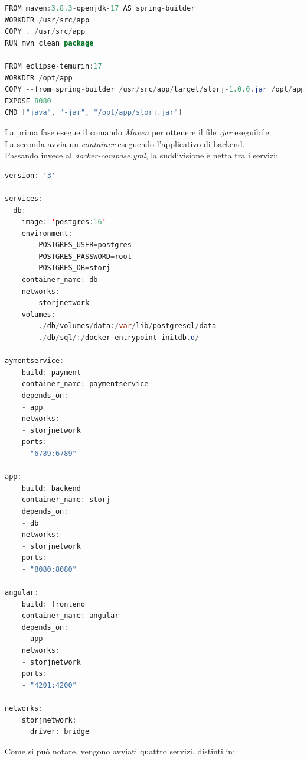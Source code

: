 \documentclass{article}
\begin{document}
\vspace*{7pt}
\begin{lstlisting}[language = JAVA]
FROM maven:3.8.3-openjdk-17 AS spring-builder
WORKDIR /usr/src/app
COPY . /usr/src/app
RUN mvn clean package

FROM eclipse-temurin:17
WORKDIR /opt/app
COPY --from=spring-builder /usr/src/app/target/storj-1.0.0.jar /opt/app/storj.jar
EXPOSE 8080
CMD ["java", "-jar", "/opt/app/storj.jar"]
\end{lstlisting}
La prima fase esegue il comando \textit{Maven} per ottenere il file \textit{.jar} eseguibile.\\
La seconda avvia un \textit{container} eseguendo l'applicativo di backend.\vspace*{130pt}\\
Passando invece al \textit{docker-compose.yml}, la suddivisione è netta tra i servizi:\vspace*{7pt}
\begin{lstlisting}[language = JAVA]
version: '3'

services:
  db:
    image: 'postgres:16'
    environment:
      - POSTGRES_USER=postgres
      - POSTGRES_PASSWORD=root
      - POSTGRES_DB=storj
    container_name: db
    networks:
      - storjnetwork
    volumes:
      - ./db/volumes/data:/var/lib/postgresql/data
      - ./db/sql/:/docker-entrypoint-initdb.d/

aymentservice:
    build: payment
    container_name: paymentservice
    depends_on:
    - app
    networks:
    - storjnetwork
    ports:
    - "6789:6789"

app:
    build: backend
    container_name: storj
    depends_on:
    - db
    networks:
    - storjnetwork
    ports:
    - "8080:8080"

angular:
    build: frontend
    container_name: angular
    depends_on:
    - app
    networks:
    - storjnetwork
    ports:
    - "4201:4200"

networks:
    storjnetwork:
      driver: bridge
\end{lstlisting}
Come si può notare, vengono avviati quattro servizi, distinti in:
\end{document}
